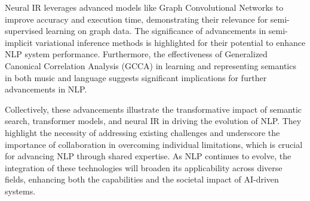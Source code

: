 Neural IR leverages advanced models like Graph Convolutional Networks to improve accuracy and execution time, demonstrating their relevance for semi-supervised learning on graph data. The significance of advancements in semi-implicit variational inference methods is highlighted for their potential to enhance NLP system performance. Furthermore, the effectiveness of Generalized Canonical Correlation Analysis (GCCA) in learning and representing semantics in both music and language suggests significant implications for further advancements in NLP.



Collectively, these advancements illustrate the transformative impact of semantic search, transformer models, and neural IR in driving the evolution of NLP. They highlight the necessity of addressing existing challenges and underscore the importance of collaboration in overcoming individual limitations, which is crucial for advancing NLP through shared expertise. As NLP continues to evolve, the integration of these technologies will broaden its applicability across diverse fields, enhancing both the capabilities and the societal impact of AI-driven systems.